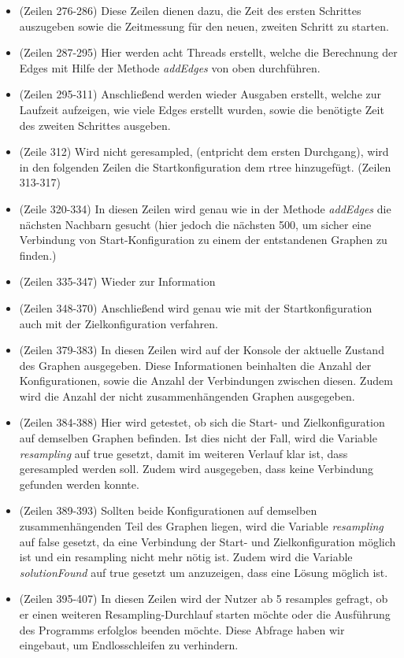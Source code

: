 \documentclass[a4paper]{scrartcl}
\begin{document}
\begin{itemize}
\begin{itemize}
		\item (Zeilen 276-286) Diese Zeilen dienen dazu, die Zeit des ersten Schrittes auszugeben sowie die Zeitmessung für den neuen, zweiten Schritt zu starten.
		\item (Zeilen 287-295) Hier werden acht Threads erstellt, welche die Berechnung der Edges mit Hilfe der Methode \textit{addEdges} von oben durchführen.
		\item (Zeilen 295-311) Anschließend werden wieder Ausgaben erstellt, welche zur Laufzeit aufzeigen, wie viele Edges erstellt wurden, sowie die benötigte Zeit des zweiten Schrittes ausgeben.
		\item (Zeile 312) Wird nicht geresampled, (entpricht dem ersten Durchgang), wird in den folgenden Zeilen die Startkonfiguration dem rtree hinzugefügt. (Zeilen 313-317)
		\item (Zeile 320-334) In diesen Zeilen wird genau wie in der Methode \textit{addEdges} die nächsten Nachbarn gesucht (hier jedoch die nächsten 500, um sicher eine Verbindung von Start-Konfiguration zu einem der entstandenen Graphen zu finden.)
		\item (Zeilen 335-347) Wieder zur Information
		\item (Zeilen 348-370) Anschließend wird genau wie mit der Startkonfiguration auch mit der Zielkonfiguration verfahren.
		\item (Zeilen 379-383) In diesen Zeilen wird auf der Konsole der aktuelle Zustand des Graphen ausgegeben. Diese Informationen beinhalten die Anzahl der Konfigurationen, sowie die Anzahl der Verbindungen zwischen diesen. Zudem wird die Anzahl der nicht zusammenhängenden Graphen ausgegeben.
		\item (Zeilen 384-388) Hier wird getestet, ob sich die Start- und Zielkonfiguration auf demselben Graphen befinden. Ist dies nicht der Fall, wird die Variable \textit{resampling} auf true gesetzt, damit im weiteren Verlauf klar ist, dass geresampled werden soll. Zudem wird ausgegeben, dass keine Verbindung gefunden werden konnte.
		\item (Zeilen 389-393) Sollten beide Konfigurationen auf demselben zusammenhängenden Teil des Graphen liegen, wird die Variable \textit{resampling} auf false gesetzt, da eine Verbindung der Start- und Zielkonfiguration möglich ist und ein resampling nicht mehr nötig ist. Zudem wird die Variable \textit{solutionFound} auf true gesetzt um anzuzeigen, dass eine Lösung möglich ist.
		\item (Zeilen 395-407) In diesen Zeilen wird der Nutzer ab 5 resamples gefragt, ob er einen weiteren Resampling-Durchlauf starten möchte oder die Ausführung des Programms erfolglos beenden möchte. Diese Abfrage haben wir eingebaut, um Endlosschleifen zu verhindern.

\end{itemize}
\end{itemize}
\end{document}
